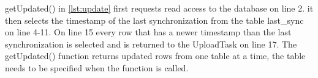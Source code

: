 

getUpdated() in \autoref{lst:update} first requests read access to the database on line 2. it then selects the timestamp of the last synchronization from the table last\_sync on line 4-11. On line 15 every row that has a newer timestamp than the last synchronization is selected and is returned to the UploadTask on line 17. The getUpdated() function returns updated rows from one table at a time, the table needs to be specified when the function is called.

